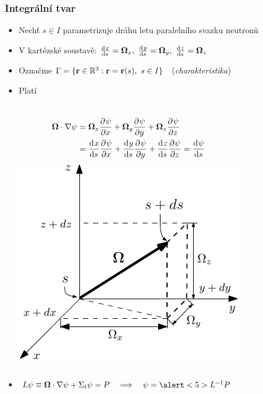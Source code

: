 \begin{frame}
  \frametitle{Integrální tvar}
  
\begin{itemize}
  \item Nechť $s\in I$ parametrizuje dráhu letu paralelního svazku neutronů
  \item V kartézské soustavě: $\der{x}{s} = \bomega_x,\ \der{y}{s} = \bomega_y,\ \der{z}{s} = \bomega_z$
	\item<2-> Označme $\Gamma = \{\br\in\RR[3]: \br = \br(s),\ s\in I\}$ ~(\emph{\color{structure}charakteristika})
	\item<3-> Platí
	  \begin{columns}
	    \begin{align*}
	      \bomega\cdot\nabla\angflux &= \bomega_x\pd{\angflux}{x} + 
	      \bomega_y\pd{\angflux}{y} + \bomega_z\pd{\angflux}{z}\\
	      & = 
	      \der{x}{s}\pd{\angflux}{x} + \der{y}{s}\pd{\angflux}{y} + \der{z}{s}\pd{\angflux}{z}
	      = 
	      \der{\angflux}{s}
	    \end{align*}
	  \hspace{-1.25em}\includegraphics[width=1.15\textwidth]{obr/cartesian_streaming2}
	  \end{columns}\vspace{1em}
  \item<4-> $L\angflux \equiv \bomega\cdot\nabla\angflux + \Sigma_t\angflux = P\quad \Longrightarrow\quad \angflux = \alert<5>{L^{-1}}P$ 
\end{itemize}

\end{frame}

